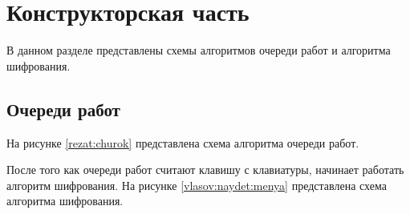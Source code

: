 \section{\large Конструкторская часть}

В данном разделе представлены схемы алгоритмов очереди работ и алгоритма шифрования.

\subsection{Очереди работ}

На рисунке \ref{rezat:churok} представлена схема алгоритма очереди работ.

\begin{figure}[ht!]
\end{figure}

После того как очереди работ считают клавишу с клавиатуры, начинает работать алгоритм шифрования.
На рисунке \ref{vlasov:naydet:menya} представлена схема алгоритма шифрования.

